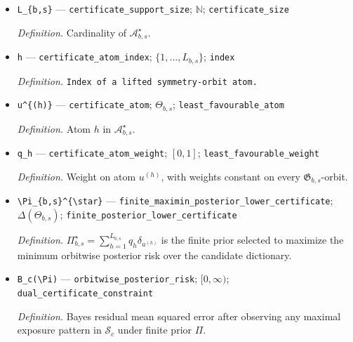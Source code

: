\documentclass{article}
\begin{document}
\begin{itemize}
  \par\smallskip\noindent\emph{Definition.} Finite candidate atom dictionary produced from an optimal mode-SDP primal--dual pair by the posterior-collision lift and closure under \(\mathfrak G_{b,s}\).
  \item \texttt{L\_\allowbreak{}\{b,\allowbreak{}s\}\allowbreak{}} --- \texttt{certificate\_\allowbreak{}support\_\allowbreak{}size}; \(\mathbb N\); \texttt{certificate\_\allowbreak{}size}
  \par\smallskip\noindent\emph{Definition.} Cardinality of \(\mathcal A_{b,s}^{\star}\).
  \item \texttt{h} --- \texttt{certificate\_\allowbreak{}atom\_\allowbreak{}index}; \(\{1,\ldots,L_{b,s}\}\); \texttt{index}
  \par\smallskip\noindent\emph{Definition.} \texttt{Index of a lifted symmetry-\allowbreak{}orbit atom.}
  \item \texttt{u\textasciicircum{}\{(h)\}\allowbreak{}} --- \texttt{certificate\_\allowbreak{}atom}; \(\Theta_{b,s}\); \texttt{least\_\allowbreak{}favourable\_\allowbreak{}atom}
  \par\smallskip\noindent\emph{Definition.} Atom \(h\) in \(\mathcal A_{b,s}^{\star}\).
  \item \texttt{q\_\allowbreak{}h} --- \texttt{certificate\_\allowbreak{}atom\_\allowbreak{}weight}; \([0,1]\); \texttt{least\_\allowbreak{}favourable\_\allowbreak{}weight}
  \par\smallskip\noindent\emph{Definition.} Weight on atom \(u^{(h)}\), with weights constant on every \(\mathfrak G_{b,s}\)-orbit.
  \item \texttt{\textbackslash{}\allowbreak{}Pi\_\allowbreak{}\{b,\allowbreak{}s\}\allowbreak{}\textasciicircum{}\{\textbackslash{}\allowbreak{}star\}\allowbreak{}} --- \texttt{finite\_\allowbreak{}maximin\_\allowbreak{}posterior\_\allowbreak{}lower\_\allowbreak{}certificate}; \(\Delta(\Theta_{b,s})\); \texttt{finite\_\allowbreak{}posterior\_\allowbreak{}lower\_\allowbreak{}certificate}
  \par\smallskip\noindent\emph{Definition.} \(\Pi_{b,s}^{\star}=\sum_{h=1}^{L_{b,s}}q_h\delta_{u^{(h)}}\) is the finite prior selected to maximize the minimum orbitwise posterior risk over the candidate dictionary.
  \item \texttt{B\_\allowbreak{}c(\textbackslash{}\allowbreak{}Pi)} --- \texttt{orbitwise\_\allowbreak{}posterior\_\allowbreak{}risk}; \([0,\infty)\); \texttt{dual\_\allowbreak{}certificate\_\allowbreak{}constraint}
  \par\smallskip\noindent\emph{Definition.} Bayes residual mean squared error after observing any maximal exposure pattern in \(\mathcal S_c\) under finite prior \(\Pi\).

\end{itemize}
\end{document}

